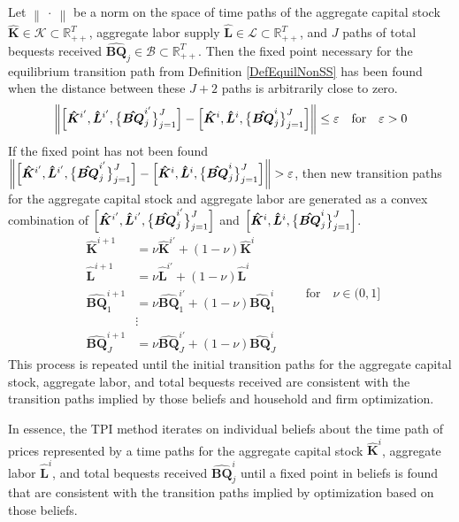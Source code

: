 \documentclass[letterpaper,12pt]{article}
\theoremstyle{definition}
\newcommand\ve{\varepsilon}
\newcommand\norm[1]{\left\lVert#1\right\rVert}
\begin{document}
  Let $\norm{\:\cdot\:}$ be a norm on the space of time paths of the aggregate capital stock $\bm{\hat{K}}\in\mathcal{K}\subset\mathbb{R}_{++}^T$, aggregate labor supply $\bm{\hat{L}}\in\mathcal{L}\subset\mathbb{R}_{++}^T$, and $J$ paths of total bequests received $\bm{\hat{BQ}}_j\in\mathcal{B}\subset\mathbb{R}_{++}^T$. Then the fixed point necessary for the equilibrium transition path from Definition \ref{DefEquilNonSS} has been found when the distance between these $J+2$ paths is arbitrarily close to zero.
  \begin{equation}\label{EqTPIconverge}
    \norm{\Bigl[\bm{\hat{K}}^{i'}, \bm{\hat{L}}^{i'},\bigl\{\bm{\hat{BQ}}_j^{i'}\bigr\}_{j=1}^J\Bigr] - \Bigl[\bm{\hat{K}}^{i},\bm{\hat{L}}^{i},\bigl\{\bm{\hat{BQ}}_j^{i}\bigr\}_{j=1}^J\Bigr]} \leq \ve \quad\text{for}\quad \ve>0
  \end{equation}
  If the fixed point has not been found $\norm{\Bigl[\bm{\hat{K}}^{i'}, \bm{\hat{L}}^{i'},\bigl\{\bm{\hat{BQ}}_j^{i'}\bigr\}_{j=1}^J\Bigr] - \Bigl[\bm{\hat{K}}^{i},\bm{\hat{L}}^{i},\bigl\{\bm{\hat{BQ}}_j^{i}\bigr\}_{j=1}^J\Bigr]} > \ve$, then new transition paths for the aggregate capital stock and aggregate labor are generated as a convex combination of $\Bigl[\bm{\hat{K}}^{i'},\bm{\hat{L}}^{i'},\bigl\{\bm{\hat{BQ}}_j^{i'}\bigr\}_{j=1}^J\Bigr]$ and $\Bigl[\bm{\hat{K}}^{i},\bm{\hat{L}}^{i},\bigl\{\bm{\hat{BQ}}_j^{i}\bigr\}_{j=1}^J\Bigr]$.
  \begin{equation}\label{EqTPInewpath}
    \begin{split}
      \bm{\hat{K}}^{i+1} &= \nu\bm{\hat{K}}^{i'} + (1-\nu)\bm{\hat{K}}^{i} \\
      \bm{\hat{L}}^{i+1} &= \nu\bm{\hat{L}}^{i'} + (1-\nu)\bm{\hat{L}}^{i} \\
      \bm{\hat{BQ}}_1^{i+1} &= \nu\bm{\hat{BQ}}_1^{i'} + (1-\nu)\bm{\hat{BQ}}_1^{i} \\
      &\vdots \\
      \bm{\hat{BQ}}_J^{i+1} &= \nu\bm{\hat{BQ}}_J^{i'} + (1-\nu)\bm{\hat{BQ}}_J^{i}
    \end{split} \quad\quad\text{for}\quad \nu\in(0,1]
  \end{equation}
  This process is repeated until the initial transition paths for the aggregate capital stock, aggregate labor, and total bequests received are consistent with the transition paths implied by those beliefs and household and firm optimization.

  In essence, the TPI method iterates on individual beliefs about the time path of prices represented by a time paths for the aggregate capital stock $\bm{\hat{K}}^i$, aggregate labor $\bm{\hat{L}}^i$, and total bequests received $\bm{\hat{BQ}}_j^i$ until a fixed point in beliefs is found that are consistent with the transition paths implied by optimization based on those beliefs.
\end{document}
